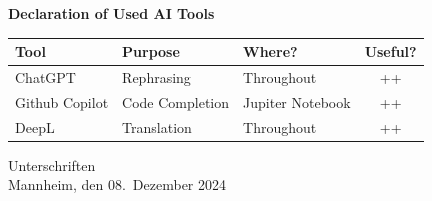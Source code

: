 \documentclass[a4paper,oneside,bibliography=totoc]{scrbook}
\begin{document}
\begin{center}
  \textbf{Declaration of Used AI Tools} \\[.3em]
  \begin{tabularx}{\textwidth}{lXlc}
    \toprule
    Tool & Purpose & Where? & Useful? \\
    \midrule
    ChatGPT & Rephrasing & Throughout & ++ \\
    Github Copilot & Code Completion & Jupiter Notebook & ++ \\
    DeepL & Translation & Throughout & ++ \\
    \bottomrule
  \end{tabularx}
\end{center}

\vspace{1.8cm}
\noindent Unterschriften\\
\noindent Mannheim, den 08.~Dezember 2024 \hfill
\end{document}
